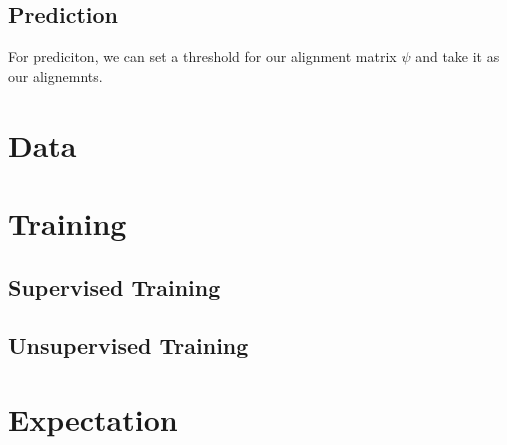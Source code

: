 \documentclass[twoside,twocolumn]{article}
\begin{document}

\subsection{Prediction}

For prediciton, we can set a threshold for our alignment matrix $\psi$ and take it as our alignemnts.

\section{Data}

\section{Training}

\subsection{Supervised Training}

\subsection{Unsupervised Training}

\section{Expectation}




\end{document}
